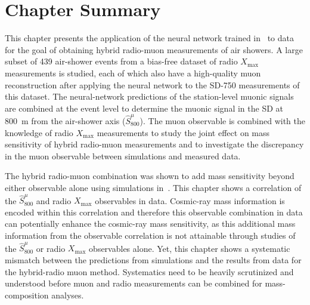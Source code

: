 




\section{Chapter Summary}\label{sec:ch6_summary}

This chapter presents the application of the neural network trained in~ to data for the goal of obtaining hybrid radio-muon measurements of air showers.
A large subset of 439 air-shower events from a bias-free dataset of radio $X_{\text{max}}$ measurements is studied, each of which also have a high-quality muon reconstruction after applying the neural network to the SD-750 measurements of this dataset.
The neural-network predictions of the station-level muonic signals are combined at the event level to determine the muonic signal in the SD at \qty{800}{\meter} from the air-shower axis ($\hat{S}^{\mu}_{800}$).
The muon observable is combined with the knowledge of radio $X_{\text{max}}$ measurements to study the joint effect on mass sensitivity of hybrid radio-muon measurements and to investigate the discrepancy in the muon observable between simulations and measured data.

The hybrid radio-muon combination was shown to add mass sensitivity beyond either observable alone using simulations in~.
This chapter shows a correlation of the $\hat{S}^{\mu}_{800}$ and radio $X_{\text{max}}$ observables in data.
Cosmic-ray mass information is encoded within this correlation and therefore this observable combination in data can potentially enhance the cosmic-ray mass sensitivity, as this additional mass information from the observable correlation is not attainable through studies of the $\hat{S}^{\mu}_{800}$ or radio $X_{\text{max}}$ observables alone.
Yet, this chapter shows a systematic mismatch between the predictions from simulations and the results from data for the hybrid-radio muon method.
Systematics need to be heavily scrutinized and understood before muon and radio measurements can be combined for mass-composition analyses.


